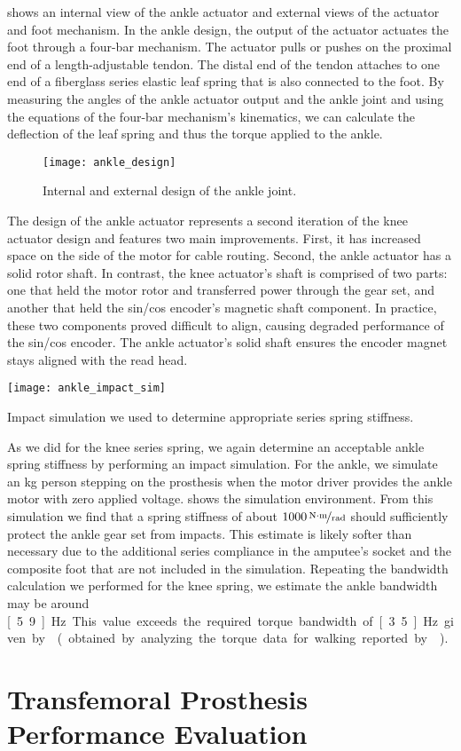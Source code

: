  shows an internal view of the ankle actuator and
external views of the actuator and foot mechanism. In the ankle design, the
output of the actuator actuates the foot through a four-bar mechanism. The
actuator pulls or pushes on the proximal end of a length-adjustable tendon. The
distal end of the tendon attaches to one end of a fiberglass series elastic leaf
spring that is also connected to the foot. By measuring the angles of the ankle
actuator output and the ankle joint and using the equations of the four-bar
mechanism's kinematics, we can calculate the deflection of the leaf spring and
thus the torque applied to the ankle.
\begin{figure*}[b!]
    \centering 
    \texttt{[image: ankle\_design]}
    \caption{Internal and external design of the ankle 
    joint.}\label{fig:ankle_design}
\end{figure*}

The design of the ankle actuator represents a second iteration of the knee
actuator design and features two main improvements.  First, it has increased
space on the side of the motor for cable routing. Second, the ankle actuator has
a solid rotor shaft. In contrast, the knee actuator's shaft is comprised of two
parts: one that held the motor rotor and transferred power through the gear set,
and another that held the sin/cos encoder's magnetic shaft component. In
practice, these two components proved difficult to align, causing degraded
performance of the sin/cos encoder. The ankle actuator's solid shaft ensures the
encoder magnet stays aligned with the read head.

\begin{marginfigure}[-0.0in]
    \centering 
    \texttt{[image: ankle\_impact\_sim]}
    \caption{Impact simulation we used to determine appropriate series spring
    stiffness.}\label{fig:ankle_impact_sim}
\end{marginfigure}
As we did for the knee series spring, we again determine an acceptable ankle
spring stiffness by performing an impact simulation. For the ankle, we simulate
an \unit[80]{kg} person stepping on the prosthesis when the motor driver
provides the ankle motor with zero applied voltage. 
shows the simulation environment. From this simulation we find that a spring
stiffness of about $\unitfrac[1000]{N \cdot m}{rad}$ should sufficiently protect
the ankle gear set from impacts. This estimate is likely softer than necessary
due to the additional series compliance in the amputee's socket and the
composite foot that are not included in the simulation.
Repeating the bandwidth calculation we performed for the knee spring, we
estimate the ankle bandwidth may be around \unit[5.9]{Hz}. This value exceeds
the required torque bandwidth of \unit[3.5]{Hz} given by \citet{au2008powered}
(obtained by analyzing the torque data for walking reported by
\citet{winter2009biomechanics}).

\section{Transfemoral Prosthesis Performance Evaluation}\label{sec:pros_perf_eval}
